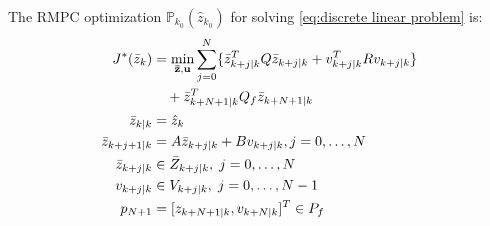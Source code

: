 %


The RMPC optimization  $\mathbb{P}_{k_0}(\hat{z}_{k_0})$ for solving \eqref{eq:discrete linear problem} is:
\begin{subequations} 
\label{eq:nom mpc}
\begin{align}
J^{*}(\bar{z}_{k}) &= \min_{\mathbf{\bar{z}},\mathbf{u}} \sum_{j=0}^{N}\lbrace \bar{z}_{k+j|k}^{T}Q \bar{z}_{k+j|k} + {v}_{k+j|k}^{T}R{v}_{k+j|k}\rbrace \nonumber \\ 
                    &\quad  +  \bar{z}_{k+N+1|k}^T Q_f \bar{z}_{k+N+1|k}  \label{eq:cost} \\
\bar{z}_{k|k}       &= \hat{z}_{k} \label{eq:init_cond}\\
\bar{z}_{k+j+1|k} &=A\bar{z}_{k+j|k} + Bv_{k+j|k} , j=0,\ldots,N\label{eq:nom_dyn} \\
\bar{z}_{k+j|k}     & \in \bar{Z}_{k+j|k} , \; j=0,\ldots,N \label{eq:states_con}\\
v_{k+j|k}        & \in  V_{k+j|k} , \;j=0,\ldots,N-1 \label{eq:input_con} \\
p_{N+1}               &= \lbrack z_{k+N+1|k} , v_{k+N|k} \rbrack^{T}  \in P_f \label{eq:joint_term} 
	\end{align}
\end{subequations}


